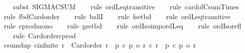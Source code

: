 \begin{isabellebody}
\ \ \isamarkupfalse%
\ {\isacharparenleft}{\kern0pt}subst\ SIGMA{\isacharunderscore}{\kern0pt}CSUM{\isacharparenright}{\kern0pt}\isanewline
\ \ \isamarkupfalse%
\ {\isacharparenleft}{\kern0pt}rule\ ordLeq{\isacharunderscore}{\kern0pt}transitive{\isacharparenright}{\kern0pt}\isanewline
\ \ \isamarkupfalse%
\ {\isacharparenleft}{\kern0pt}rule\ card{\isacharunderscore}{\kern0pt}of{\isacharunderscore}{\kern0pt}Csum{\isacharunderscore}{\kern0pt}Times{\isacharprime}{\kern0pt}{\isacharparenright}{\kern0pt}\isanewline
\ \ \isamarkupfalse%
\ {\isacharparenleft}{\kern0pt}rule\ fbd{\isacharunderscore}{\kern0pt}Card{\isacharunderscore}{\kern0pt}order{\isacharparenright}{\kern0pt}\isanewline
\ \ \isamarkupfalse%
\ {\isacharparenleft}{\kern0pt}rule\ ballI{\isacharparenright}{\kern0pt}\isanewline
\ \ \isamarkupfalse%
\ {\isacharparenleft}{\kern0pt}rule\ fset{\isacharunderscore}{\kern0pt}bd{\isacharparenright}{\kern0pt}\isanewline
\ \ \isamarkupfalse%
\ {\isacharparenleft}{\kern0pt}rule\ ordLeq{\isacharunderscore}{\kern0pt}transitive{\isacharparenright}{\kern0pt}\isanewline
\ \ \isamarkupfalse%
\ {\isacharparenleft}{\kern0pt}rule\ cprod{\isacharunderscore}{\kern0pt}mono{}{\isacharparenright}{\kern0pt}\isanewline
\ \ \isamarkupfalse%
\ {\isacharparenleft}{\kern0pt}rule\ gset{\isacharunderscore}{\kern0pt}bd{\isacharparenright}{\kern0pt}\isanewline
\ \ \isamarkupfalse%
\ {\isacharparenleft}{\kern0pt}rule\ ordIso{\isacharunderscore}{\kern0pt}imp{\isacharunderscore}{\kern0pt}ordLeq{\isacharparenright}{\kern0pt}\isanewline
\ \ \isamarkupfalse%
\ {\isacharparenleft}{\kern0pt}rule\ ordIso{\isacharunderscore}{\kern0pt}refl{\isacharparenright}{\kern0pt}\isanewline
\ \ \isamarkupfalse%
\ {\isacharparenleft}{\kern0pt}rule\ Card{\isacharunderscore}{\kern0pt}order{\isacharunderscore}{\kern0pt}cprod{\isacharparenright}{\kern0pt}\isanewline
\ \ \isamarkupfalse%
%
\endisatagproof
{\isafoldproof}%
%
\isadelimproof
\isanewline
%
\endisadelimproof
\isanewline
{}\isamarkupfalse%
\ csum{\isacharunderscore}{\kern0pt}dup{\isacharcolon}{\kern0pt}\ {\isachardoublequoteopen}cinfinite\ r\ {\isasymLongrightarrow}\ Card{\isacharunderscore}{\kern0pt}order\ r\ {\isasymLongrightarrow}\ p\ {\isacharplus}{\kern0pt}c\ p{\isacharprime}{\kern0pt}\ {\isacharequal}{\kern0pt}o\ r\ {\isacharplus}{\kern0pt}c\ r\ {\isasymLongrightarrow}\ p\ {\isacharplus}{\kern0pt}c\ p{\isacharprime}{\kern0pt}\ {\isacharequal}{\kern0pt}o\ r{\isachardoublequoteclose}\isanewline

\end{isabellebody}
